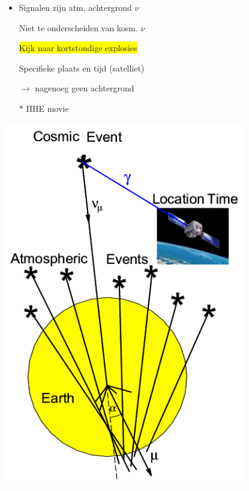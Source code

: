 \twocolumn

\vspace*{1cm}

\begin{itemize}
\item Signalen zijn atm. achtergrond $\nu$
\item[] Niet te onderscheiden van kosm. $\nu$\\[3mm]
\item[] \colorbox{yellow}{Kijk naar kortstondige explosies}\\
\item[] Specifieke plaats en tijd (satelliet)
\item[] $\rightarrow$ nagenoeg geen achtergrond
\item[$\ast$] {\blue IIHE movie}
\end{itemize}

\newpage

\begin{center}
\includegraphics[keepaspectratio,height=16cm]{atm-bkg}
\end{center}
